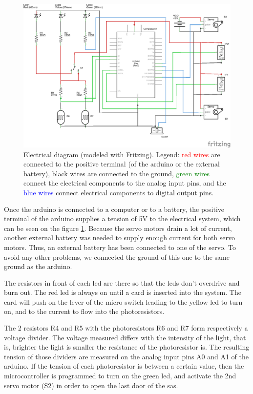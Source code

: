 \begin{figure}[!h]
	\centering
    \includegraphics[scale=1]{ElectronicScheme1.png}
    \caption{Electrical diagram (modeled with Fritzing). Legend: \textcolor{red}{red wires} are connected to the positive terminal (of the arduino or the external battery), black wires are connected to the ground, \textcolor{green}{green wires} connect the electrical components to the analog input pins, and the \textcolor{blue}{blue wires} connect electrical components to digital output pins.}
    \label{elecScheme}
\end{figure}

Once the arduino is connected to a computer or to a battery, the positive terminal of the arduino supplies a tension of 5V to the electrical system, which can be seen on the figure \ref{elecScheme}. Because the servo motors drain a lot of current, another external battery was needed to supply enough current for both servo motors. Thus, an external battery has been connected to one of the servo. To avoid any other problems, we connected the ground of this one to the same ground as the arduino.

The resistors in front of each led are there so that the leds don't overdrive and burn out. The red led is always on until a card is inserted into the system. The card will push on the lever of the micro switch leading to the yellow led to turn on, and to the current to flow into the photoresistors.

The 2 resistors R4 and R5 with the photoresistors R6 and R7 form respectively a voltage divider. The voltage measured differs with the intensity of the light, that is, brighter the light is smaller the resistance of the photoresistor is. The resulting tension of those dividers are measured on the analog input pins A0 and A1 of the arduino. If the tension of each photoresistor is between a certain value, then the microcontroller is programmed to turn on the green led, and activate the 2nd servo motor (S2) in order to open the last door of the sas. 

